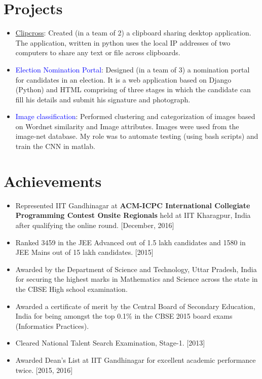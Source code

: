 \documentclass[margin, centered]{res}
\begin{document}
\begin{resume}
\section{Projects}
\begin{itemize}[leftmargin=*]
\item \href{https://github.com/arikpamnani/clipcross}{Clipcross}: Created (in a team of 2) a clipboard sharing desktop application. The application, written in python uses the local IP addresses of two computers to share any text or file across clipboards.

\item \textcolor{blue}{Election Nomination Portal}: Designed (in a team of 3) a nomination portal for candidates in an election. It is a web application based on Django (Python) and HTML comprising of three stages in which the candidate can fill his details and submit his signature and photograph.

\item \textcolor{blue}{Image classification}: Performed clustering and categorization of images based on Wordnet similarity and Image attributes. Images were used from the image-net database. My role was to automate testing (using bash scripts) and train the CNN in matlab. 

\end{itemize}

\section{Achievements}
\begin{itemize}[leftmargin=*]
\item Represented IIT Gandhinagar at {\bf ACM-ICPC International Collegiate Programming Contest Onsite Regionals} held at IIT Kharagpur, India after qualifying the online round. 
\hfill {[December, 2016]}
\item Ranked 3459 in the JEE Advanced out of 1.5 lakh candidates and 1580 in JEE Mains out of 15 lakh candidates.
\hfill {[2015]}
\item Awarded by the Department of Science and Technology, Uttar Pradesh, India for securing the highest marks in Mathematics and Science across the state in the CBSE High school examination.
\item Awarded a certificate of merit by the Central Board of Secondary Education, India for being amongst the top 0.1\% in the CBSE 2015 board exams (Informatics Practices).
\item Cleared National Talent Search Examination, Stage-1. \hfill{[2013]}
\item Awarded Dean{'}s List at IIT Gandhinagar for excellent academic performance twice. \hfill{[2015, 2016]}
\end{itemize}


\end{resume}
\end{document}
